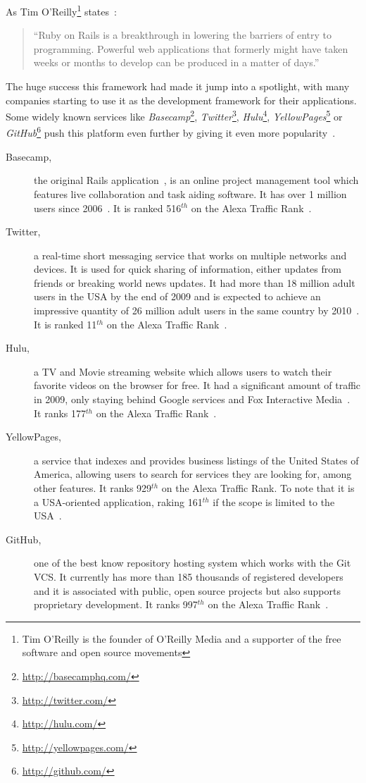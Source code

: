 As Tim O'Reilly\footnote{Tim O'Reilly is the founder of O'Reilly Media and a supporter of the free software and open source movements} states~\cite{oreilly_ror}:
\begin{quote}
  ``Ruby on Rails is a breakthrough in lowering the barriers of entry to programming. Powerful web applications that formerly might have taken weeks or months to develop can be produced in a matter of days.''
\end{quote}
The huge success this framework had made it jump into a spotlight, with many companies starting to use it as the development framework for their applications. Some widely known services like \textit{Basecamp}\footnote{\url{http://basecamphq.com/}}, \textit{Twitter}\footnote{\url{http://twitter.com/}}, \textit{Hulu}\footnote{\url{http://hulu.com/}}, \textit{YellowPages}\footnote{\url{http://yellowpages.com/}} or \textit{GitHub}\footnote{\url{http://github.com/}} push this platform even further by giving it even more popularity~\cite{rubyonrails_applications}.
\begin{description}
  \item[Basecamp,] the original Rails application~\cite{rubyonrails_applications}, is an online project management tool which features live collaboration and task aiding software. It has over 1 million users since 2006~\cite{basecamp_turns_1000000}. It is ranked 516$^{th}$ on the Alexa Traffic Rank~\cite{alexa}.
  \item[Twitter,] a real-time short messaging service that works on multiple networks and devices. It is used for quick sharing of information, either updates from friends or breaking world news updates. It had more than 18 million adult users in the USA by the end of 2009 and is expected to achieve an impressive quantity of 26 million adult users in the same country by 2010~\cite{emarketer_twitter_usage}. It is ranked 11$^{th}$ on the Alexa Traffic Rank~\cite{alexa}.
  \item[Hulu,] a TV and Movie streaming website which allows users to watch their favorite videos on the browser for free. It had a significant amount of traffic in 2009, only staying behind Google services and Fox Interactive Media~\cite{hulu_growth}. It ranks 177$^{th}$ on the Alexa Traffic Rank~\cite{alexa}.
  \item[YellowPages,] a service that indexes and provides business listings of the United States of America, allowing users to search for services they are looking for, among other features. It ranks 929$^{th}$ on the Alexa Traffic Rank. To note that it is a USA-oriented application, raking 161$^{th}$ if the scope is limited to the USA~\cite{alexa}.
  \item[GitHub,] one of the best know repository hosting system which works with the Git VCS. It currently has more than 185 thousands of registered developers and it is associated with public, open source projects but also supports proprietary development. It ranks 997$^{th}$ on the Alexa Traffic Rank~\cite{alexa}.
\end{description}
